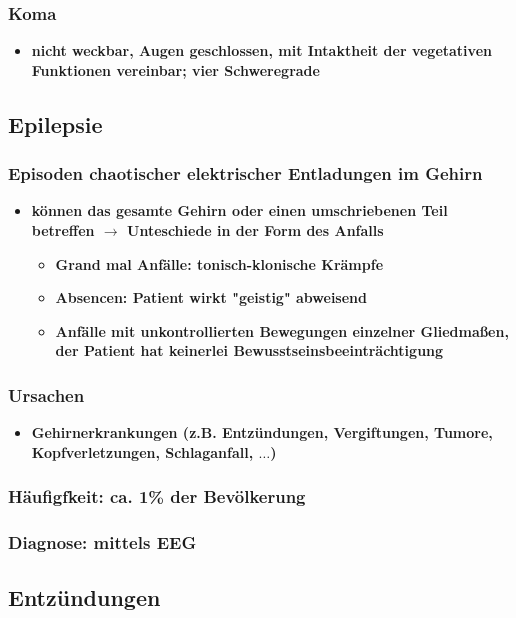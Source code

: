 		\subsubsection*{Koma}
			\begin{itemize}
				\item \textbf{nicht weckbar, Augen geschlossen, mit Intaktheit der vegetativen Funktionen vereinbar; vier Schweregrade}
			\end{itemize}
	\subsection*{Epilepsie}
		\subsubsection*{Episoden chaotischer elektrischer Entladungen im Gehirn}
			\begin{itemize}
				\item \textbf{können das gesamte Gehirn oder einen umschriebenen Teil betreffen $\rightarrow$ Unteschiede in der Form des Anfalls}
					\begin{itemize}
						\item \textbf{Grand mal Anfälle: tonisch-klonische Krämpfe}
						\item \textbf{Absencen: Patient wirkt "geistig" abweisend}
						\item \textbf{Anfälle mit unkontrollierten Bewegungen einzelner Gliedmaßen, der Patient hat keinerlei Bewusstseinsbeeinträchtigung}
					\end{itemize}
			\end{itemize}
		\subsubsection*{Ursachen}
			\begin{itemize}
				\item \textbf{Gehirnerkrankungen (z.B. Entzündungen, Vergiftungen, Tumore, Kopfverletzungen, Schlaganfall, $\dots$)}
			\end{itemize}
		\subsubsection*{Häufigfkeit: ca. 1\% der Bevölkerung}
		\subsubsection*{Diagnose: mittels EEG}
	\subsection*{Entzündungen}
